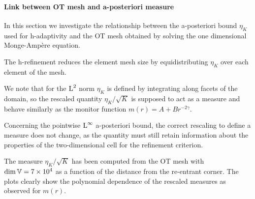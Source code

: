 \documentclass[a4paper,11pt]{article}
\begin{document}
{\clearpage
\newpage


\paragraph{Link between OT mesh and a-posteriori measure}

In this section we investigate the relationship between the a-posteriori bound $\eta_{K}$ used for h-adaptivity and the OT mesh obtained by solving the one dimensional Monge-Ampère equation.

The h-refinement reduces the element mesh size by equidistributing $\eta_{K}$ over each element of the mesh.

We note that for the $\operatorname L^{2}$ norm $\eta_{K}$ is defined by integrating along facets of the domain, so the rescaled quantity $\eta_{K} / \sqrt{K}$ is supposed to act as a measure and behave similarly as the monitor function $m(r) = A + B r^{-2\gamma}$.


Concerning the pointwise $\operatorname L^{\infty}$ a-posteriori bound, the correct rescaling to define a measure does not change, as the quantity must still retain information about the properties of the two-dimensional cell for the refinement criterion.

The measure $\eta_{K} / \sqrt{K}$ has been computed from the OT mesh with $\dim \mathbb V = 7 \times 10^{4}$ as a function of the distance from the re-entrant corner. The plots clearly show the polynomial dependence of the rescaled measures as observed for $m(r)$.
 

}
\end{document}
